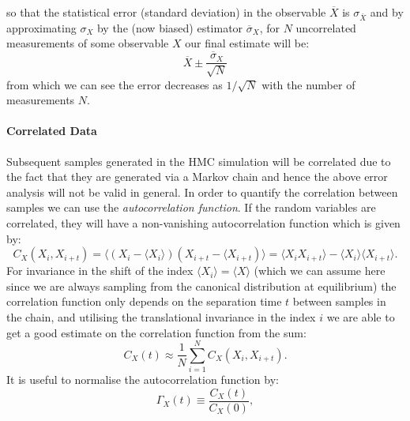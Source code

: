 \documentclass[12pt]{article}
\begin{document}
            so that the statistical error (standard deviation) in the observable $\overline{X}$ is $\sigma_{\overline{X}}$ and by approximating $\sigma_X$ by the (now biased) estimator $\overline{\sigma}_X$, for $N$ uncorrelated measurements of some observable $X$ our final estimate will be:
            \begin{equation}
                \label{eq:niaveerror}
                \overline{X}\pm \frac{\overline{\sigma}_X}{\sqrt{N}}
            \end{equation}
            from which we can see the error decreases as $1/\sqrt{N}$ with the number of measurements $N$.



            \paragraph{Correlated Data} Subsequent samples generated in the HMC simulation will be correlated due to the fact that they are generated via a Markov chain and hence the above error analysis will not be valid in general. In order to quantify the correlation between samples we can use the \textit{autocorrelation function}. If the random variables are correlated, they will have a non-vanishing autocorrelation function which is given by:
            \begin{equation}
                C_{X}\left(X_i,X_{i+t}\right) = \langle \left(X_i-\langle X_i\rangle\right)\left(X_{i+t}-\langle X_{i+t}\right)\rangle = \langle X_iX_{i+t}\rangle - \langle X_i \rangle \langle X_{i+t} \rangle.
            \end{equation}
            For invariance in the shift of the index $\langle X_i \rangle = \langle X \rangle$ (which we can assume here since we are always sampling from the canonical distribution at equilibrium) the correlation function only depends on the separation time $t$ between samples in the chain, and utilising the translational invariance in the index $i$ we are able to get a good estimate on the correlation function from the sum:
            \begin{equation}
                C_{X}\left(t\right) \approx \frac{1}{N}\sum_{i=1}^NC_X\left(X_i,X_{i+t}\right).
            \end{equation}
            It is useful to normalise the autocorrelation function by:
            \begin{equation}
                \label{eq:normalisedAutocorrelation}
                \Gamma_{X}\left(t\right) \equiv \frac{C_X\left(t\right)}{C_X\left(0\right)},
            \end{equation}
\end{document}
